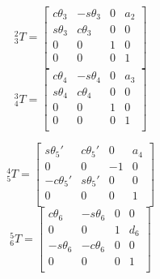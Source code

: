 \begin{multicols}{2}
    \noindent
    \begin{equation}
        ^2_3T = \begin{bmatrix}
                    c\theta_3 & -s\theta_3 & 0 & a_2 \\
                    s\theta_3 & c\theta_3 & 0 & 0 \\
                    0 & 0 & 1 & 0 \\
                    0 & 0 & 0 & 1 \\
                \end{bmatrix}
    \end{equation}
    \begin{equation}
        ^3_4T = \begin{bmatrix}
                    c\theta_4 & -s\theta_4 & 0 & a_3 \\
                    s\theta_4 & c\theta_4 & 0 & 0 \\
                    0 & 0 & 1 & 0 \\
                    0 & 0 & 0 & 1 \\
                \end{bmatrix}
    \end{equation}
\end{multicols}

\begin{multicols}{2}
    \noindent
    \begin{equation}
        \label{eq:t45}
        ^4_5T = \begin{bmatrix}
                    s\theta_5' & c\theta_5' & 0 & a_4 \\
                    0 & 0 & -1 & 0 \\
                    -c\theta_5' & s\theta_5' & 0 & 0 \\
                    0 & 0 & 0 & 1 \\        
                \end{bmatrix}
    \end{equation}
    \begin{equation}
        \label{eq:t56}
        ^5_6T = \begin{bmatrix}
                    c\theta_6 & -s\theta_6 & 0 & 0 \\
                    0 & 0 & 1 & d_6 \\
                    -s\theta_6 & -c\theta_6 & 0 & 0 \\
                    0 & 0 & 0 & 1 \\
                \end{bmatrix}
    \end{equation}
\end{multicols}


